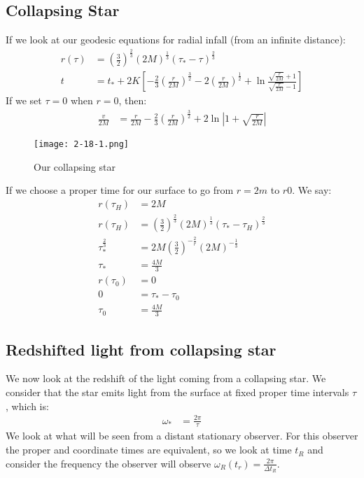 \subsection{Collapsing Star}
If we look at our geodesic equations for radial infall (from an infinite distance):
\begin{align*}
	r(\tau) &= \left(\frac{3}{2}\right)^\frac{2}{3} (2M)^\frac{1}{3}(\tau_* - \tau)^\frac{2}{3} \\
	t &= t_* + 2K\left[ -\frac{2}{3}\left(\frac{r}{2M}\right)^\frac{3}{2} - 2\left(\frac{r}{2M}\right)^\frac{1}{2} + \ln \frac{\sqrt{\frac{r}{2M}} +1}{\sqrt{\frac{r}{2M}} -1}\right]
\end{align*}
If we set $\tau = 0$ when $r=0$, then:
\begin{align*}
	\frac{v}{2M} &= \frac{r}{2M} - \frac{2}{3} \left(\frac{r}{2M}\right)^\frac{3}{2} + 2\ln| 1 + \sqrt{\frac{r}{2M}}|
\end{align*}
\begin{figure*}[h]
	\centering
	\texttt{[image: 2-18-1.png]}
	\caption*{Our collapsing star}
\end{figure*}
If we choose a proper time for our surface to go from $r=2m$ to $r0$. We say:
\begin{align*}
	r(\tau_H) &= 2M \\
	r(\tau_H) &=\left(\frac{3}{2}\right)^\frac{2}{3} (2M)^\frac{1}{3}(\tau_* - \tau_H)^\frac{2}{3} \\
	\tau_*^\frac{2}{3} &= 2M \left(\frac{3}{2}\right)^{-\frac{2}{r}} (2M)^{-\frac{1}{3}} \\
	\tau_* &= \frac{4M}{3} \\
	r(\tau_0) &= 0 \\
	0 &= \tau_* - \tau_0 \\
	\tau_0 &= \frac{4M}{3}
\end{align*}

\subsection{Redshifted light from collapsing star}
We now look at the redshift of the light coming from a collapsing star. We consider that the star emits light from the surface at fixed proper time intervals $\tau$, which is:
\begin{align*}
	\omega_* &= \frac{2\pi}{\tau}
\end{align*}
We look at what will be seen from a distant stationary observer. For this observer the proper and coordinate times are equivalent, so we look at time $t_R$ and consider the frequency the observer will observe $\omega_R(t_r) = \frac{2\pi}{\Delta t_R}$.

